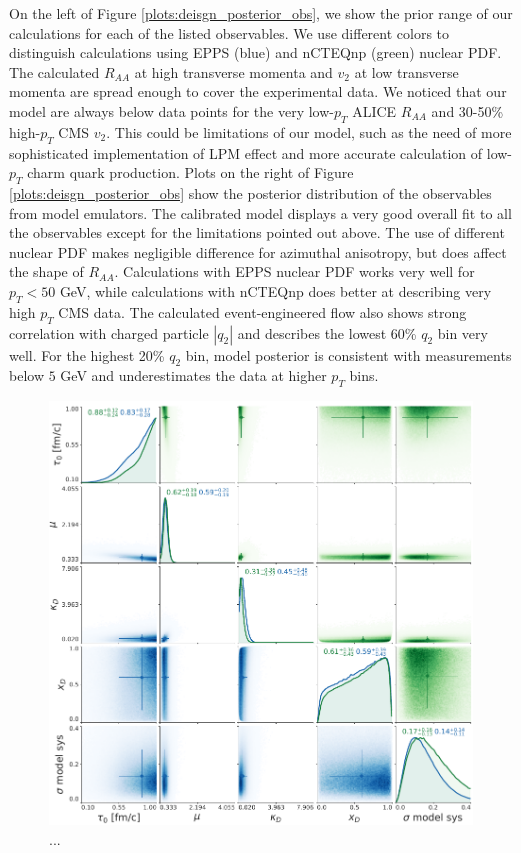 \documentclass[aps, prc, reprint, amsmath, groupedaddress, nofootinbib]{revtex4-1}
\begin{document}
On the left of Figure \ref{plots:deisgn_posterior_obs}, we show the prior range of our calculations for each of the listed observables. 
We use different colors to distinguish calculations using EPPS (blue) and
nCTEQnp (green) nuclear PDF.
The calculated $R_{AA}$ at high transverse momenta and $v_2$ at low transverse momenta are spread enough to cover the experimental data.
We noticed that our model are always below data points for the very low-$p_T$ ALICE $R_{AA}$ and 30-50\% high-$p_T$ CMS $v_2$.
This could be limitations of our model, such as the need of more sophisticated implementation of LPM effect and more accurate calculation of low-$p_T$ charm quark production. 
Plots on the right of Figure \ref{plots:deisgn_posterior_obs} show the posterior distribution of the observables from model emulators.
The calibrated model displays a very good overall fit to all the observables except for the limitations pointed out above.
The use of different nuclear PDF makes negligible difference for azimuthal anisotropy, but does affect the shape of $R_{AA}$.
Calculations with EPPS nuclear PDF works very well for $p_T < 50$ GeV, while calculations with nCTEQnp does better at describing very high $p_T$ CMS data.
The calculated event-engineered flow also shows strong correlation with charged particle $|q_2|$ and describes the lowest 60\% $q_2$ bin very well.
For the highest 20\% $q_2$ bin, model posterior is consistent with measurements below $5$ GeV and underestimates the data at higher $p_T$ bins.

\begin{figure}
\includegraphics[width=.5\textwidth]{posterior.pdf}
\caption{...}\label{plots:posterior}
\end{figure}
\end{document}
